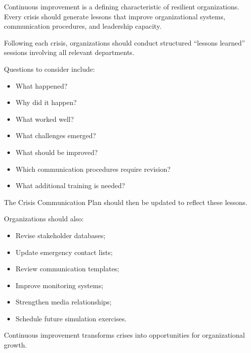 \documentclass[10pt]{article}
\begin{document}
Continuous improvement is a defining characteristic of resilient organizations. Every crisis should generate lessons that improve organizational systems, communication procedures, and leadership capacity.

Following each crisis, organizations should conduct structured ``lessons learned'' sessions involving all relevant departments.

Questions to consider include:
\begin{itemize}
    \item What happened?
    \item Why did it happen?
    \item What worked well?
    \item What challenges emerged?
    \item What should be improved?
    \item Which communication procedures require revision?
    \item What additional training is needed?
\end{itemize}

The Crisis Communication Plan should then be updated to reflect these lessons.

Organizations should also:
\begin{itemize}
    \item Revise stakeholder databases;
    \item Update emergency contact lists;
    \item Review communication templates;
    \item Improve monitoring systems;
    \item Strengthen media relationships;
    \item Schedule future simulation exercises.
\end{itemize}

Continuous improvement transforms crises into opportunities for organizational growth.
\end{document}
